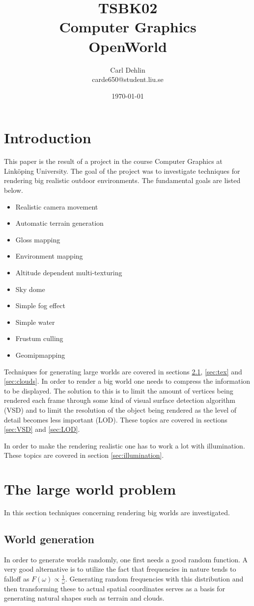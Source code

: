 \documentclass{article}
\title{TSBK02\\Computer Graphics\\OpenWorld}
\author{Carl Dehlin\\carde650@student.liu.se}
\date{\today}
\begin{document}
\maketitle

\section{Introduction}
This paper is the result of a project in the course Computer Graphics at Linköping University. 
The goal of the project was to investigate techniques for rendering big realistic outdoor environments.
The fundamental goals are listed below.
\begin{itemize}
    \item Realistic camera movement
    \item Automatic terrain generation
    \item Gloss mapping
    \item Environment mapping
    \item Altitude dependent multi-texturing
    \item Sky dome
    \item Simple fog effect
    \item Simple water
    \item Frustum culling
    \item Geomipmapping
\end{itemize}

Techniques for generating large worlds are covered in sections \ref{sec:wgen}, \ref{sec:tex} and \ref{sec:clouds}.
In order to render a big world one needs to compress the information to be displayed.
The solution to this is to limit the amount of vertices being rendered each frame through some kind of
visual surface detection algorithm (VSD) and to limit the resolution of the object being rendered as the level of detail becomes less important (LOD). These topics are covered in sections \ref{sec:VSD} and \ref{sec:LOD}.

In order to make the rendering realistic one has to work a lot with illumination. These topics are covered in section \ref{sec:illumination}.

\section{The large world problem}
In this section techniques concerning rendering big worlds are investigated.

\subsection{World generation} \label{sec:wgen}
In order to generate worlds randomly, one first needs a good random function.
A very good alternative is to utilize the fact that frequencies in nature tends to falloff as $F(\omega) \propto \frac1\omega$.
Generating random frequencies with this distribution and then transforming these to actual spatial coordinates serves as a basis for generating natural shapes such as terrain and clouds.
\end{document}

